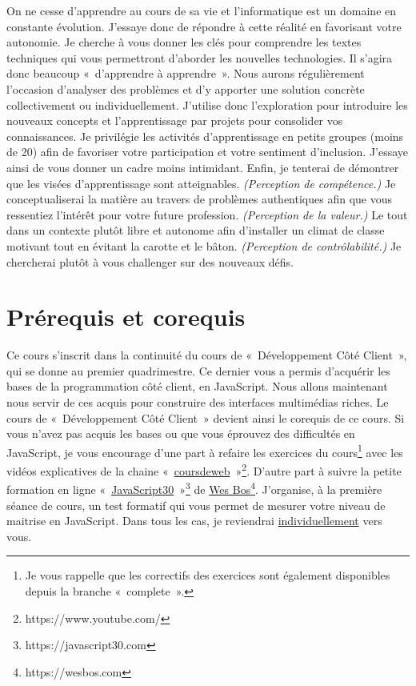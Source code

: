 On ne cesse d’apprendre au cours de sa vie et l’informatique est un domaine en constante évolution. J’essaye donc de répondre à cette réalité en favorisant votre autonomie. Je cherche à vous donner les clés pour comprendre les textes techniques qui vous permettront d’aborder les nouvelles technologies. Il s’agira donc beaucoup «~d’apprendre à apprendre~». Nous aurons régulièrement l’occasion d’analyser des problèmes et d’y apporter une solution concrète collectivement ou individuellement. J’utilise donc l'exploration pour introduire les nouveaux concepts et l’apprentissage par projets pour consolider vos connaissances. Je privilégie les activités d’apprentissage en petits groupes (moins de 20) afin de favoriser votre participation et votre sentiment d’inclusion. J’essaye ainsi de vous donner un cadre moins intimidant.
Enfin, je tenterai de démontrer que les visées d’apprentissage sont atteignables. \textit{(Perception de compétence.)} Je conceptualiserai la matière au travers de problèmes authentiques afin que vous ressentiez l'intérêt pour votre future profession. \textit{(Perception de la valeur.)} Le tout dans un contexte plutôt libre et autonome afin d'installer un climat de classe motivant \cite{viau1994motivation} tout en évitant la carotte et le bâton. \textit{(Perception de contrôlabilité.)} Je chercherai plutôt à vous challenger sur des nouveaux défis.

\clearpage
\section{Prérequis et corequis}

Ce cours s’inscrit dans la continuité du cours de «~Développement Côté Client~», qui se donne au premier quadrimestre. Ce dernier vous a permis d’acquérir les bases de la programmation côté client, en JavaScript. Nous allons maintenant nous servir de ces acquis pour construire des interfaces multimédias riches. Le cours de «~Développement Côté Client~» devient ainsi le corequis de ce cours.
Si vous n’avez pas acquis les bases ou que vous éprouvez des difficultés en JavaScript, je vous encourage d’une part à refaire les exercices du cours\footnote{Je vous rappelle que les correctifs des exercices sont également disponibles depuis la branche «~complete~».} avec les vidéos explicatives de la chaine «~\href{https://www.youtube.com/@coursdeweb}{coursdeweb}~»\footnote{https://www.youtube.com/\@coursdeweb}. D’autre part à suivre la petite formation en ligne «~\href{https://javascript30.com}{JavaScript30}~»\footnote{https://javascript30.com} de \href{https://wesbos.com}{Wes Bos}\footnote{https://wesbos.com}. J'organise, à la première séance de cours, un test formatif qui vous permet de mesurer votre niveau de maitrise en JavaScript. Dans tous les cas, je reviendrai \underline{individuellement} vers vous.


